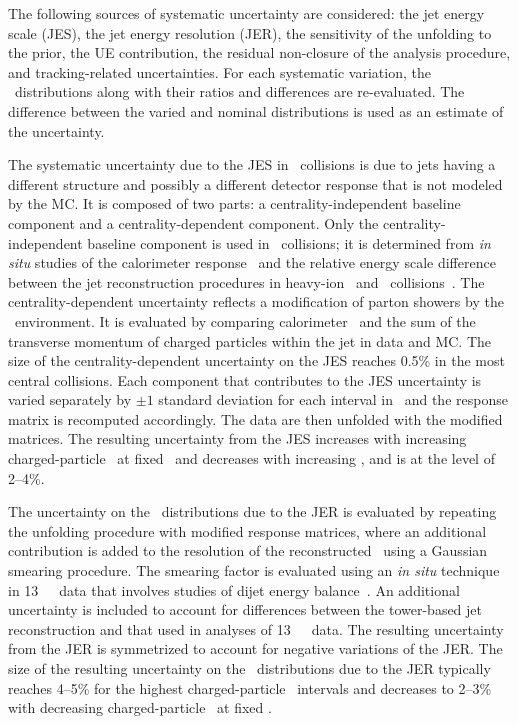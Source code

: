 
The following sources of systematic uncertainty are considered:
the jet energy scale (JES), the jet energy resolution (JER), 
the sensitivity of the  unfolding to the prior, the UE contribution, the residual non-closure of the analysis procedure, and tracking-related uncertainties.
For each systematic variation, the \Dptr\ distributions along with their ratios and differences are re-evaluated. The difference between the varied and nominal distributions is used as an estimate of the uncertainty.

The systematic uncertainty due to the JES in \PbPb\ collisions is due to jets having a different structure and possibly a different detector response that is not modeled by the MC. It is composed of two parts: 
a centrality-independent baseline component and a centrality-dependent component. Only the centrality-independent baseline component is used in \pp\ collisions; 
it is determined from \textit{in situ} studies of the calorimeter
response~\cite{Aad:2011he,HIjesnote,Aaboud:2017jcu} and the relative energy scale difference between the jet reconstruction procedures in heavy-ion~\cite{HIjesnote} and \pp\ collisions~\cite{Aad:2014bia}. The centrality-dependent uncertainty reflects a modification of parton showers by the \PbPb\ environment. It is evaluated by comparing calorimeter \ptjet\ and the sum of the transverse momentum of charged particles within the jet in data and MC. The size of the centrality-dependent uncertainty on the JES reaches 0.5\% in the most central collisions. Each component that contributes to the JES uncertainty is varied separately by $\pm1$ standard deviation for each interval in \ptjet\ and the response matrix is recomputed accordingly. The data are then unfolded with the modified matrices. The resulting uncertainty from the JES increases with increasing charged-particle \pT\ at fixed \ptjet\ and decreases with increasing \ptjet, and is at the level of 2--4\%.

The uncertainty on the \Dptr\ distributions due to the JER is evaluated by repeating the unfolding procedure with modified response matrices, where an additional contribution is added to the resolution of the reconstructed \ptjet\ using a Gaussian smearing procedure. The smearing factor is evaluated using an \textit{in situ} technique in 13~\TeV\ \pp\ data that involves studies of dijet energy balance~\cite{Aad:2012ag,JERConfNote}. An additional uncertainty is included to account for differences between the tower-based jet reconstruction and that used in analyses of 13~\TeV\ \pp\ data. The resulting uncertainty from the JER is symmetrized to account for negative variations of the JER.  The size of the resulting uncertainty on the \Dptr\ distributions due to the JER typically reaches 4--5\% for the highest charged-particle \pT\ intervals and decreases to 2--3\% with decreasing charged-particle \pT\ at fixed \ptjet.


